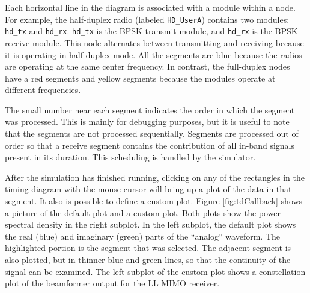 Each horizontal line in the diagram is associated with a module
within a node.  For example, the half-duplex radio (labeled
\verb+HD_UserA+) contains two modules: \verb+hd_tx+ and
\verb+hd_rx+. \verb+hd_tx+ is the BPSK transmit module, and
\verb+hd_rx+ is the BPSK receive module. This node alternates
between transmitting and receiving because it is operating in
half-duplex mode.  All the segments are blue because the radios are
operating at the same center frequency. In contrast, the full-duplex
nodes have a red segments and yellow segments because the modules
operate at different frequencies.

The small number near each segment indicates the order in which the
segment was processed.  This is mainly for debugging purposes, but
it is useful to note that the segments are not processed
sequentially.  Segments are processed out of order so that a receive
segment contains the contribution of all in-band signals present in
its duration.  This scheduling is handled by the simulator.


After the simulation has finished running, clicking on any of the
rectangles in the timing diagram with the mouse cursor will bring up
a plot of the data in that segment.  It also is possible to define a
custom plot.  Figure \ref{fig:tdCallback} shows a picture of the
default plot and a custom plot.  Both plots show the power spectral
density in the right subplot.  In the left subplot, the default plot
shows the real (blue) and imaginary (green) parts of the ``analog''
waveform. The highlighted portion is the segment that was selected.
The adjacent segment is also plotted, but in thinner blue and green
lines, so that the continuity of the signal can be examined.  The
left subplot of the custom plot shows a constellation plot of the
beamformer output for the LL MIMO receiver.

